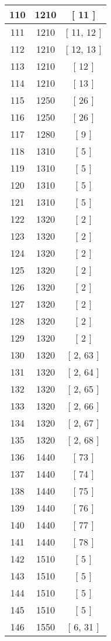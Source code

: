 \begin{center}
\begin{longtable}[H]{|| c c c ||}
\hline
110 & 1210 & [ 11 ] \\ 
\hline
111 & 1210 & [ 11, 12 ] \\ 
\hline
112 & 1210 & [ 12, 13 ] \\ 
\hline
113 & 1210 & [ 12 ] \\ 
\hline
114 & 1210 & [ 13 ] \\ 
\hline
115 & 1250 & [ 26 ] \\ 
\hline
116 & 1250 & [ 26 ] \\ 
\hline
117 & 1280 & [ 9 ] \\ 
\hline
118 & 1310 & [ 5 ] \\ 
\hline
119 & 1310 & [ 5 ] \\ 
\hline
120 & 1310 & [ 5 ] \\ 
\hline
121 & 1310 & [ 5 ] \\ 
\hline
122 & 1320 & [ 2 ] \\ 
\hline
123 & 1320 & [ 2 ] \\ 
\hline
124 & 1320 & [ 2 ] \\ 
\hline
125 & 1320 & [ 2 ] \\ 
\hline
126 & 1320 & [ 2 ] \\ 
\hline
127 & 1320 & [ 2 ] \\ 
\hline
128 & 1320 & [ 2 ] \\ 
\hline
129 & 1320 & [ 2 ] \\ 
\hline
130 & 1320 & [ 2, 63 ] \\ 
\hline
131 & 1320 & [ 2, 64 ] \\ 
\hline
132 & 1320 & [ 2, 65 ] \\ 
\hline
133 & 1320 & [ 2, 66 ] \\ 
\hline
134 & 1320 & [ 2, 67 ] \\ 
\hline
135 & 1320 & [ 2, 68 ] \\ 
\hline
136 & 1440 & [ 73 ] \\ 
\hline
137 & 1440 & [ 74 ] \\ 
\hline
138 & 1440 & [ 75 ] \\ 
\hline
139 & 1440 & [ 76 ] \\ 
\hline
140 & 1440 & [ 77 ] \\ 
\hline
141 & 1440 & [ 78 ] \\ 
\hline
142 & 1510 & [ 5 ] \\ 
\hline
143 & 1510 & [ 5 ] \\ 
\hline
144 & 1510 & [ 5 ] \\ 
\hline
145 & 1510 & [ 5 ] \\ 
\hline
146 & 1550 & [ 6, 31 ] \\ 

\end{longtable}
\end{center}
